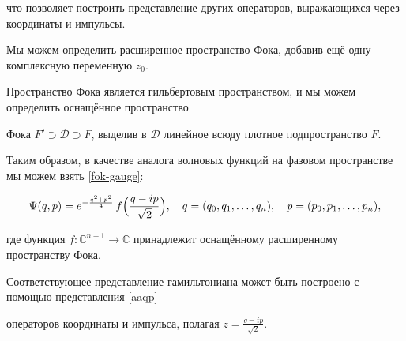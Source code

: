  что позволяет построить представление других операторов, выражающихся через координаты и импульсы.



 Мы можем определить расширенное пространство Фока, добавив ещё одну комплексную переменную $z_0$.



 Пространство Фока является гильбертовым пространством, и мы можем определить оснащённое пространство

 Фока $F'\supset \mathcal{D}\supset F$, выделив в $\mathcal{D}$ линейное всюду плотное подпространство $F$.



 Таким образом, в качестве аналога волновых функций на фазовом пространстве мы можем взять \eqref{fok-gauge}:

\begin{equation}\label{Psi(qp)}

 \Psi({q},{p})=e^{-\frac{q^2+p^2}4}\,f\Bigl(\frac{{q}-i{p}}{\sqrt2}\Bigr),\quad

 q=(q_0,q_1,\dots,q_n),\quad

 p=(p_0,p_1,\dots,p_n),

\end{equation}

где функция $f:\mathbb{C}^{n+1}\to\mathbb{C}$ принадлежит оснащённому расширенному пространству Фока.

Соответствующее представление гамильтониана может быть построено с помощью представления \eqref{aaqp}

операторов координаты и импульса, полагая $z=\frac{q-ip}{\sqrt2}$.




\smallskip



